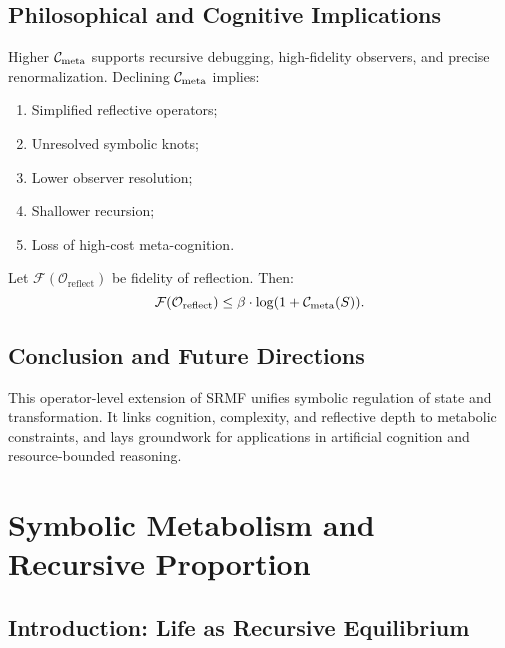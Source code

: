 \subsection*{Philosophical and Cognitive Implications}
\label{subsec:bk5_philosophical_and_cognitive_implications}
\begin{scholium} \label{scholium:bk5_metabolic_cost_of_cognition}
Higher $\mathcal{C}_{\text{meta}}$ supports recursive debugging, high-fidelity observers, and precise renormalization. Declining $\mathcal{C}_{\text{meta}}$ implies:
\begin{enumerate}
    \item Simplified reflective operators;
    \item Unresolved symbolic knots;
    \item Lower observer resolution;
    \item Shallower recursion;
    \item Loss of high-cost meta-cognition.
\end{enumerate}
\end{scholium}
\begin{theorem} \label{thm:bk5_metabolic_constraints_reflective_accuracy}
Let $\mathcal{F}(\mathcal{O}_{\text{reflect}})$ be fidelity of reflection. Then:
\[
\mathcal{F}(\mathcal{O}_{\text{reflect}}) \leq \beta \cdot \log(1 + \mathcal{C}_{\text{meta}}(S)).
\]
\end{theorem}
\subsection*{Conclusion and Future Directions}
\label{subsec:bk5_conclustion_and_future_directions}
This operator-level extension of SRMF unifies symbolic regulation of state and transformation. It links cognition, complexity, and reflective depth to metabolic constraints, and lays groundwork for applications in artificial cognition and resource-bounded reasoning.

\section{Symbolic Metabolism and Recursive Proportion}
\label{sec:bk5_golden_ratio}

\subsection{Introduction: Life as Recursive Equilibrium}
\label{subsec:bk5_intro_recursive_equilibrium}

